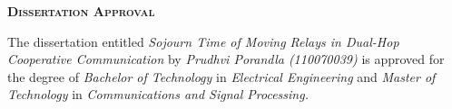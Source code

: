 
\newpage

\thispagestyle{empty}
\begin{center}
  \begin{Huge}
    \textsc{\textbf{Dissertation Approval}}
  \end{Huge}
\end{center}

\vspace{0.2in}

 The dissertation entitled \textit{Sojourn Time of Moving Relays in Dual-Hop Cooperative Communication} by \textit{Prudhvi Porandla (110070039)} is approved for the degree of \textit{Bachelor of Technology} in \textit{Electrical Engineering} and \textit{Master of Technology} in \textit{Communications and Signal Processing.}


\vspace{0.1in}

